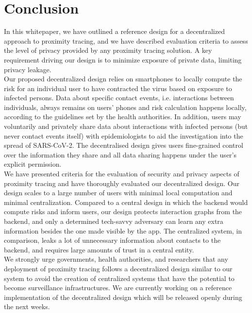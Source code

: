 \documentclass[12pt,a4paper]{article}
\begin{document}
\section*{Conclusion}
In this whitepaper, we have outlined a reference design for a decentralized approach to
proximity tracing, and we have described evaluation criteria to assess the level of privacy provided by any proximity tracing solution. A key requirement driving our design is to minimize exposure of private data, limiting privacy leakage.\\[0.3cm]
Our proposed decentralized design relies on smartphones to locally compute the risk for an
individual user to have contracted the virus based on exposure to infected persons. Data
about specific contact events, i.e. interactions between individuals, always remains on users’ phones and risk calculation happens locally, according to the guidelines set by the health authorities. In addition, users may voluntarily and privately share data about interactions with infected persons (but never contact events itself) with epidemiologists to aid the investigation into the spread of SARS-CoV-2. The decentralised design gives users fine-grained control over the information they share and all data sharing happens under the user’s explicit permission.\\[0.3cm]
We have presented criteria for the evaluation of security and privacy aspects of proximity
tracing and have thoroughly evaluated our decentralized design. Our design scales to a
large number of users with minimal local computation and minimal centralization. Compared
to a central design in which the backend would compute risks and inform users, our design
protects interaction graphs from the backend, and only a determined tech-savvy adversary
can learn any extra information besides the one made visible by the app. The centralized
system, in comparison, leaks a lot of unnecessary information about contacts to the
backend, and requires large amounts of trust in a central entity.\\[0.3cm]
We strongly urge governments, health authorities, and researchers that any deployment of
proximity tracing follows a decentralized design similar to our system to avoid the creation of centralized systems that have the potential to become surveillance infrastructures. We are currently working on a reference implementation of the decentralized design which will be released openly during the next weeks.
\end{document}
